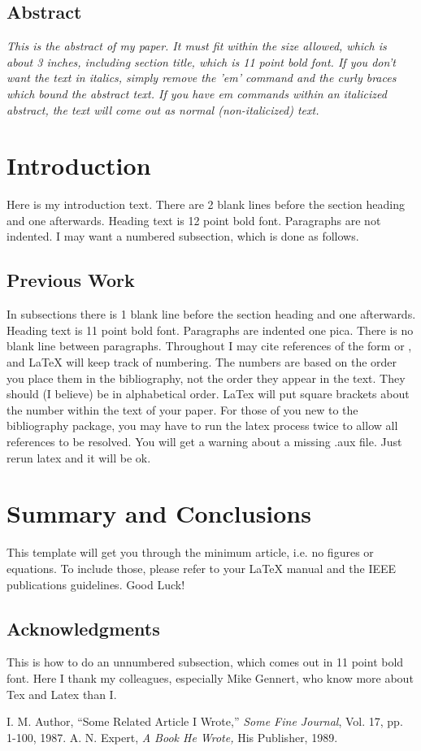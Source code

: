 \subsection*{\centering Abstract}
{\em
This is the abstract of my paper.  It must fit within the 
size allowed, which is about 3 inches, including section 
title, which is 11 point bold font.  If you don't want 
the text in italics, simply remove the 'em' command and 
the curly braces which bound the abstract text.  If you 
have em commands within an italicized abstract, the text 
will come out as normal (non-italicized) text. 
}
\section{Introduction}
Here is my introduction text.  There are 2 blank lines 
before the section heading and one afterwards.  Heading 
text is 12 point bold font.  Paragraphs are not indented. 
I may want a numbered subsection, which is done as 
follows.
\subsection{Previous Work}
In subsections there is 1 blank line before the section 
heading and one afterwards.  Heading text is 11 point 
bold font.  Paragraphs are indented one pica.  There is 
no blank line between paragraphs.
Throughout I may cite references of the form 
\cite{key:foo} or \cite{foo:baz}, and LaTeX will keep 
track of numbering.  The numbers are based on the order 
you place them in the bibliography, not the order they 
appear in the text.  They should (I believe) be in 
alphabetical order.  LaTex will put square brackets about 
the number within the text of your paper.  For those of 
you new to the bibliography package, you may have to run 
the latex process twice to allow all references to be 
resolved. You will get a warning about a missing .aux 
file.  Just rerun latex and it will be ok.
\section{Summary and Conclusions}
This template will get you through the minimum article, 
i.e. no figures or equations.  To include those, please 
refer to your LaTeX manual and the IEEE publications 
guidelines.  Good Luck!
\subsection*{Acknowledgments}
This is how to do an unnumbered subsection, which comes 
out in 11 point bold font.  Here I thank my colleagues, 
especially Mike Gennert, who know more about Tex and 
Latex than I.
\begin{thebibliography}{9}
I. M. Author,
``Some Related Article I Wrote,''
{\em Some Fine Journal}, Vol. 17, pp. 1-100, 1987.
A. N. Expert,
{\em A Book He Wrote,}
His Publisher, 1989.
\end{thebibliography}



